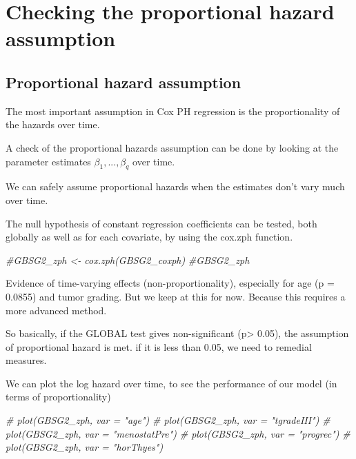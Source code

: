 \documentclass[
]{book}
\makeatletter
\newenvironment{Shaded}{\begin{snugshade}}{\end{snugshade}}
\newcommand{\CommentTok}[1]{\textcolor[rgb]{0.37,0.37,0.37}{\textit{#1}}}
\newenvironment{kframe}{%
\medskip{}
\setlength{\fboxsep}{.8em}
 \def\at@end@of@kframe{}%
 \ifinner\ifhmode%
  \def\at@end@of@kframe{\end{minipage}}%
  \begin{minipage}{\columnwidth}%
 \fi\fi%
 \def\FrameCommand##1{\hskip\@totalleftmargin \hskip-\fboxsep
 \colorbox{shadecolor}{##1}\hskip-\fboxsep
     \hskip-\linewidth \hskip-\@totalleftmargin \hskip\columnwidth}%
 \MakeFramed {\advance\hsize-\width
   \@totalleftmargin\z@ \linewidth\hsize
   \@setminipage}}%
 {\par\unskip\endMakeFramed%
 \at@end@of@kframe}
\renewenvironment{Shaded}{\begin{kframe}}{\end{kframe}}
\makeatother
\begin{document}
\hypertarget{checking-the-proportional-hazard-assumption}{%
\section{Checking the proportional hazard assumption}\label{checking-the-proportional-hazard-assumption}}

\hypertarget{proportional-hazard-assumption}{%
\subsection{Proportional hazard assumption}\label{proportional-hazard-assumption}}

The most important assumption in Cox PH regression is the proportionality of the hazards over time.

A check of the proportional hazards assumption can be done by looking at the parameter estimates \(\beta_1, ..., \beta_q\) over time.

We can safely assume proportional hazards when the estimates don't vary much over time.

The null hypothesis of constant regression coefficients can be tested, both globally as well as for each covariate, by using the cox.zph function.

\begin{Shaded}
\begin{Highlighting}[]
\CommentTok{\#GBSG2\_zph \textless{}{-} cox.zph(GBSG2\_coxph)}
\CommentTok{\#GBSG2\_zph}
\end{Highlighting}
\end{Shaded}

Evidence of time-varying effects (non-proportionality), especially for age (p = 0.0855)
and tumor grading. But we keep at this for now. Because this requires a more advanced method.

So basically, if the GLOBAL test gives non-significant (p\textgreater{} 0.05), the assumption of proportional hazard is met. if it is less than 0.05, we need to remedial measures.

We can plot the log hazard over time, to see the performance of our model (in terms of proportionality)

\begin{Shaded}
\begin{Highlighting}[]
\CommentTok{\# plot(GBSG2\_zph, var = "age")}
\CommentTok{\# plot(GBSG2\_zph, var = "tgradeIII")}
\CommentTok{\# plot(GBSG2\_zph, var = "menostatPre")}
\CommentTok{\# plot(GBSG2\_zph, var = "progrec")}
\CommentTok{\# plot(GBSG2\_zph, var = "horThyes")}
\end{Highlighting}
\end{Shaded}
\end{document}
